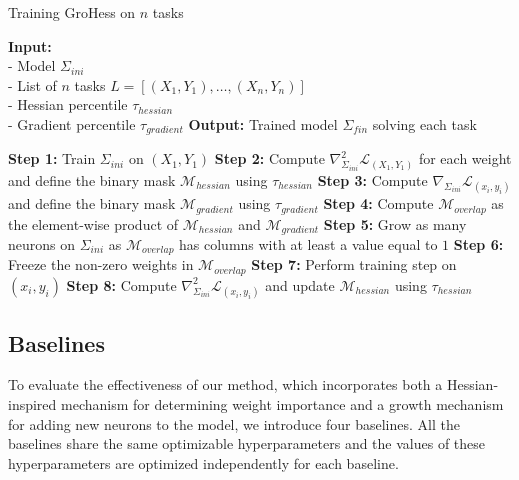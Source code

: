 \documentclass[11pt]{article}
\begin{document}
\begin{algorithm*}
    \caption{Training GroHess on $n$ tasks}
    \begin{algorithmic}[1]
    \State \textbf{Input:} \\
    - Model $\Sigma_{ini}$ \\ 
    - List of $n$ tasks $L = [(X_1,Y_1), \ldots, (X_n,Y_n)]$\\
    - Hessian percentile $\tau_{hessian}$ \\
    - Gradient percentile $\tau_{gradient}$
    \State \textbf{Output:} Trained model $\Sigma_{fin}$ solving each task
    \State
    
    \State \textbf{Step 1:} Train $\Sigma_{ini}$ on $(X_1,Y_1)$
    \State \textbf{Step 2:} Compute $\nabla^2_{\Sigma_{ini}} \mathcal{L}_{(X_1,Y_1)}$ for each weight and define the binary mask $\mathcal{M}_{hessian}$ using $\tau_{hessian}$  
                \State \textbf{Step 3:} Compute $\nabla_{\Sigma_{ini}} \mathcal{L}_{(x_i,y_i)}$ and define the binary mask $\mathcal{M}_{gradient}$ using $\tau_{gradient}$
                \State \textbf{Step 4:} Compute $\mathcal{M}_{overlap}$ as the element-wise product of $\mathcal{M}_{hessian}$ and $\mathcal{M}_{gradient}$
                \State \textbf{Step 5:} Grow as many neurons on $\Sigma_{ini}$ as $\mathcal{M}_{overlap}$ has columns with at least a value equal to $1$
                \State \textbf{Step 6:} Freeze the non-zero weights in $\mathcal{M}_{overlap}$
            \EndIf
            \State \textbf{Step 7:} Perform training step on $(x_i,y_i)$
        \EndFor
        \State \textbf{Step 8:} Compute $\nabla^2_{\Sigma_{ini}} \mathcal{L}_{(x_i,y_i)}$ and update $\mathcal{M}_{hessian}$ using $\tau_{hessian}$
    \EndFor
    \end{algorithmic}
    \label{alg:GroHess}
\end{algorithm*}


\subsection{Baselines}



To evaluate the effectiveness of our method, which incorporates both a Hessian-inspired mechanism for determining weight importance and a growth mechanism for adding new neurons to the model, we introduce four baselines. All the baselines share the same optimizable hyperparameters and the values of these hyperparameters are optimized independently for each baseline.
\end{document}
